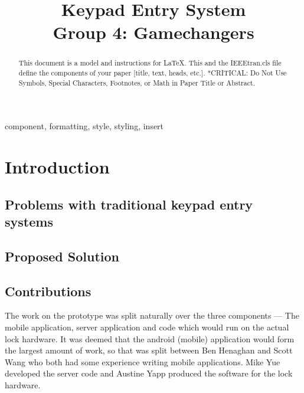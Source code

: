 \documentclass[conference]{IEEEtran}
\begin{document}
\title{Keypad Entry System\\
Group 4: Gamechangers
}

\author{
\and
{}
\and
{}
\and
{}
}

\maketitle

\begin{abstract}
This document is a model and instructions for \LaTeX.
This and the IEEEtran.cls file define the components of your paper [title, text, heads, etc.]. *CRITICAL: Do Not Use Symbols, Special Characters, Footnotes, 
or Math in Paper Title or Abstract.
\end{abstract}

\begin{IEEEkeywords}
component, formatting, style, styling, insert
\end{IEEEkeywords}

\section{Introduction}
\subsection{Problems with traditional keypad entry systems}

\subsection{Proposed Solution}

\subsection{Contributions}
The work on the prototype was split naturally over the three components --- The mobile application, server application and code which would run on the actual lock hardware.
It was deemed that the android (mobile) application would form the largest amount of work, so that was split between Ben Henaghan and Scott Wang who both had some experience writing mobile applications.
Mike Yue developed the server code and Austine Yapp produced the software for the lock hardware.
\end{document}
